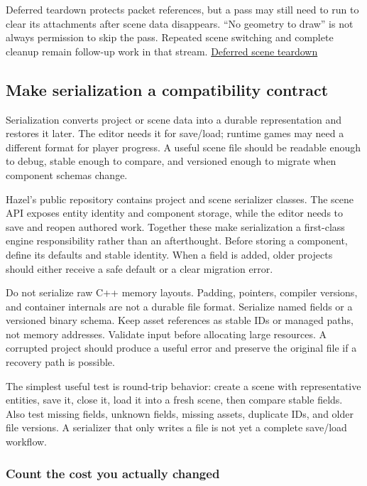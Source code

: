 Deferred teardown protects packet references, but a pass may still need to run to clear its attachments after scene data disappears. ``No geometry to draw'' is not always permission to skip the pass. Repeated scene switching and complete cleanup remain follow-up work in that stream. \href{https://www.youtube.com/watch?v=FSW72FbVUJk}{Deferred scene teardown}

\subsection{Make serialization a compatibility contract}\label{06-engine-ii-ch032-make-serialization-a-compatibility-contract}

\hypertarget{06-engine-ii-ch032-make-serialization-a-compatibility-contract}{}

Serialization converts project or scene data into a durable representation and restores it later. The editor needs it for save/load; runtime games may need a different format for player progress. A useful scene file should be readable enough to debug, stable enough to compare, and versioned enough to migrate when component schemas change.

Hazel's public repository contains project and scene serializer classes. The scene API exposes entity identity and component storage, while the editor needs to save and reopen authored work. Together these make serialization a first-class engine responsibility rather than an afterthought. Before storing a component, define its defaults and stable identity. When a field is added, older projects should either receive a safe default or a clear migration error.

Do not serialize raw C++ memory layouts. Padding, pointers, compiler versions, and container internals are not a durable file format. Serialize named fields or a versioned binary schema. Keep asset references as stable IDs or managed paths, not memory addresses. Validate input before allocating large resources. A corrupted project should produce a useful error and preserve the original file if a recovery path is possible.

The simplest useful test is round-trip behavior: create a scene with representative entities, save it, close it, load it into a fresh scene, then compare stable fields. Also test missing fields, unknown fields, missing assets, duplicate IDs, and older file versions. A serializer that only writes a file is not yet a complete save/load workflow.

\subsubsection{Count the cost you actually changed}\label{06-engine-ii-ch032-count-the-cost-you-actually-changed}

